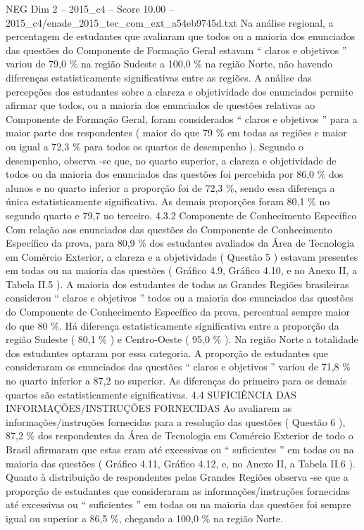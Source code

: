 \begin{textsample}{NEG Dim 2 – 2015\_c4 – Score 10.00 – 2015\_c4/enade\_2015\_tec\_com\_ext\_a54eb9745d.txt}
Na análise regional, a percentagem de estudantes que avaliaram que todos ou a maioria dos enunciados das questões do Componente de Formação Geral estavam “ claros e objetivos ” variou de 79,0 \% na região Sudeste a 100,0 \% na região Norte, não havendo diferenças estatisticamente significativas entre as regiões.
A análise das percepções dos estudantes sobre a clareza e objetividade dos enunciados permite afirmar que todos, ou a maioria dos enunciados de questões relativas ao Componente de Formação Geral, foram considerados “ claros e objetivos ” para a maior parte dos respondentes ( maior do que 79 \% em todas as regiões e maior ou igual a 72,3 \% para todos os quartos de desempenho ).
Segundo o desempenho, observa -se que, no quarto superior, a clareza e objetividade de todos ou da maioria dos enunciados das questões foi percebida por 86,0 \% dos alunos e no quarto inferior a proporção foi de 72,3 \%, sendo essa diferença a única estatisticamente significativa.
As demais proporções foram 80,1 \% no segundo quarto e 79,7 no terceiro. 4.3.2 Componente de Conhecimento Específico Com relação aos enunciados das questões do Componente de Conhecimento Específico da prova, para 80,9 \% dos estudantes avaliados da Área de Tecnologia em Comércio Exterior, a clareza e a objetividade ( Questão 5 ) estavam presentes em todas ou na maioria das questões ( Gráfico 4.9, Gráfico 4.10, e no Anexo II, a Tabela II.5 ).
A maioria dos estudantes de todas as Grandes Regiões brasileiras considerou “ claros e objetivos ” todos ou a maioria dos enunciados das questões do Componente de Conhecimento Específico da prova, percentual sempre maior do que 80 \%.
Há diferença estatisticamente significativa entre a proporção da região Sudeste ( 80,1 \% ) e Centro-Oeste ( 95,0 \% ).
Na região Norte a totalidade dos estudantes optaram por essa categoria.
A proporção de estudantes que consideraram os enunciados das questões “ claros e objetivos ” variou de 71,8 \% no quarto inferior a 87,2 no superior.
As diferenças do primeiro para os demais quartos são estatisticamente significativas. 4.4 SUFICIÊNCIA DAS INFORMAÇÕES/INSTRUÇÕES FORNECIDAS Ao avaliarem as informações/instruções fornecidas para a resolução das questões ( Questão 6 ), 87,2 \% dos respondentes da Área de Tecnologia em Comércio Exterior de todo o Brasil afirmaram que estas eram até excessivas ou “ suficientes ” em todas ou na maioria das questões ( Gráfico 4.11, Gráfico 4.12, e, no Anexo II, a Tabela II.6 ).
Quanto à distribuição de respondentes pelas Grandes Regiões observa -se que a proporção de estudantes que consideraram as informações/instruções fornecidas até excessivas ou “ suficientes ” em todas ou na maioria das questões foi sempre igual ou superior a 86,5 \%, chegando a 100,0 \% na região Norte.

\end{textsample}

